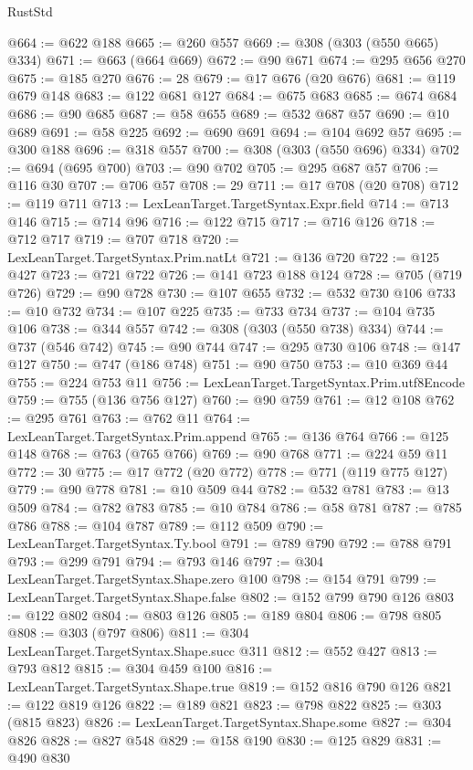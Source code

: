 \begin{lexlean}{RustStd}
\begin{coremodule}
@664 := @622 @188
@665 := @260 @557
@669 := @308 (@303 (@550 @665) @334)
@671 := @663 (@664 @669)
@672 := @90 @671
@674 := @295 @656 @270
@675 := @185 @270
@676 := 28
@679 := @17 @676 (@20 @676)
@681 := @119 @679 @148
@683 := @122 @681 @127
@684 := @675 @683
@685 := @674 @684
@686 := @90 @685
@687 := @58 @655
@689 := @532 @687 @57
@690 := @10 @689
@691 := @58 @225
@692 := @690 @691
@694 := @104 @692 @57
@695 := @300 @188
@696 := @318 @557
@700 := @308 (@303 (@550 @696) @334)
@702 := @694 (@695 @700)
@703 := @90 @702
@705 := @295 @687 @57
@706 := @116 @30
@707 := @706 @57
@708 := 29
@711 := @17 @708 (@20 @708)
@712 := @119 @711
@713 := LexLeanTarget.TargetSyntax.Expr.field
@714 := @713 @146
@715 := @714 @96
@716 := @122 @715
@717 := @716 @126
@718 := @712 @717
@719 := @707 @718
@720 := LexLeanTarget.TargetSyntax.Prim.natLt
@721 := @136 @720
@722 := @125 @427
@723 := @721 @722
@726 := @141 @723 @188 @124
@728 := @705 (@719 @726)
@729 := @90 @728
@730 := @107 @655
@732 := @532 @730 @106
@733 := @10 @732
@734 := @107 @225
@735 := @733 @734
@737 := @104 @735 @106
@738 := @344 @557
@742 := @308 (@303 (@550 @738) @334)
@744 := @737 (@546 @742)
@745 := @90 @744
@747 := @295 @730 @106
@748 := @147 @127
@750 := @747 (@186 @748)
@751 := @90 @750
@753 := @10 @369 @44
@755 := @224 @753 @11
@756 := LexLeanTarget.TargetSyntax.Prim.utf8Encode
@759 := @755 (@136 @756 @127)
@760 := @90 @759
@761 := @12 @108
@762 := @295 @761
@763 := @762 @11
@764 := LexLeanTarget.TargetSyntax.Prim.append
@765 := @136 @764
@766 := @125 @148
@768 := @763 (@765 @766)
@769 := @90 @768
@771 := @224 @59 @11
@772 := 30
@775 := @17 @772 (@20 @772)
@778 := @771 (@119 @775 @127)
@779 := @90 @778
@781 := @10 @509 @44
@782 := @532 @781
@783 := @13 @509
@784 := @782 @783
@785 := @10 @784
@786 := @58 @781
@787 := @785 @786
@788 := @104 @787
@789 := @112 @509
@790 := LexLeanTarget.TargetSyntax.Ty.bool
@791 := @789 @790
@792 := @788 @791
@793 := @299 @791
@794 := @793 @146
@797 := @304 LexLeanTarget.TargetSyntax.Shape.zero @100
@798 := @154 @791
@799 := LexLeanTarget.TargetSyntax.Shape.false
@802 := @152 @799 @790 @126
@803 := @122 @802
@804 := @803 @126
@805 := @189 @804
@806 := @798 @805
@808 := @303 (@797 @806)
@811 := @304 LexLeanTarget.TargetSyntax.Shape.succ @311
@812 := @552 @427
@813 := @793 @812
@815 := @304 @459 @100
@816 := LexLeanTarget.TargetSyntax.Shape.true
@819 := @152 @816 @790 @126
@821 := @122 @819 @126
@822 := @189 @821
@823 := @798 @822
@825 := @303 (@815 @823)
@826 := LexLeanTarget.TargetSyntax.Shape.some
@827 := @304 @826
@828 := @827 @548
@829 := @158 @190
@830 := @125 @829
@831 := @490 @830

\end{coremodule}
\end{lexlean}
